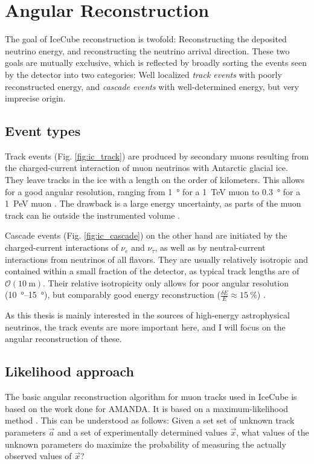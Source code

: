 \section{Angular Reconstruction}\label{reconstruction}

The goal of IceCube reconstruction is twofold: Reconstructing the deposited neutrino energy, and reconstructing the neutrino arrival direction. These two goals are mutually exclusive, which is reflected by broadly sorting the events seen by the detector into two categories: Well localized \textit{track events} with poorly reconstructed energy, and \textit{cascade events} with well-determined energy, but very imprecise origin.

\subsection{Event types}

Track events (Fig. \ref{fig:ic_track}) are produced by secondary muons resulting from the charged-current interaction of muon neutrinos with Antarctic glacial ice. They leave tracks in the ice with a length on the order of kilometers. This allows for a good angular resolution, ranging from \SI{1}{\degree} for a \SI{1}{\TeV} muon to \SI{0.3}{\degree} for a \SI{1}{\peta\eV} muon . The drawback is a large energy uncertainty, as parts of the muon track can lie outside the instrumented volume .

Cascade events (Fig. \ref{fig:ic_cascade}) on the other hand are initiated by the charged-current interactions of $\nu_e$ and $\nu_\tau$, as well as by neutral-current interactions from neutrinos of all flavors. They are usually relatively isotropic and contained within a small fraction of the detector, as typical track lengths are of $\mathcal{O}(\SI{10}{\meter})$. Their relative isotropicity only allows for poor angular resolution (\SIrange{10}{15}{\degree}), but comparably good energy reconstruction ($\frac{\delta E}{E} \approx \SI{15}{\percent}$) \cite{Aartsen2017a}.

As this thesis is mainly interested in the sources of high-energy astrophysical neutrinos, the track events are more important here, and I will focus on the angular reconstruction of these.

\subsection{Likelihood approach}
The basic angular reconstruction algorithm for muon tracks used in IceCube is based on the work done for AMANDA. It is based on a maximum-likelihood method . This can be understood as follows: Given a set set of unknown track parameters $\vec{a}$ and a set of experimentally determined values $\vec{x}$, what values of the unknown parameters do maximize the probability of measuring the actually observed values of $\vec{x}$?

